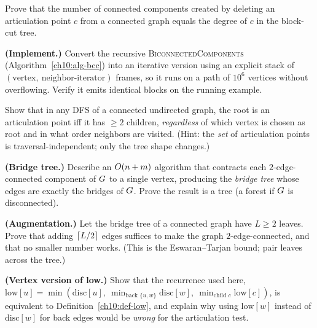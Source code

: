 \begin{exercise}
Prove that the number of connected components created by deleting an articulation point
$c$ from a connected graph equals the degree of $c$ in the block-cut tree.
\end{exercise}

\begin{exercise}
\textbf{(Implement.)} Convert the recursive \textsc{BiconnectedComponents}
(Algorithm~\ref{ch10:alg-bcc}) into an iterative version using an explicit stack of
$(\text{vertex},\ \text{neighbor-iterator})$ frames, so it runs on a path of $10^6$
vertices without overflowing. Verify it emits identical blocks on the running example.
\end{exercise}

\begin{exercise}
Show that in any DFS of a connected undirected graph, the root is an articulation point
iff it has $\ge2$ children, \emph{regardless} of which vertex is chosen as root and in
what order neighbors are visited. (Hint: the \emph{set} of articulation points is
traversal-independent; only the tree shape changes.)
\end{exercise}

\begin{exercise}
\textbf{(Bridge tree.)} Describe an $O(n+m)$ algorithm that contracts each
$2$-edge-connected component of $G$ to a single vertex, producing the \emph{bridge
tree} whose edges are exactly the bridges of $G$. Prove the result is a tree (a
forest if $G$ is disconnected).
\end{exercise}

\begin{exercise}
\textbf{(Augmentation.)} Let the bridge tree of a connected graph have $L\ge2$ leaves.
Prove that adding $\lceil L/2\rceil$ edges suffices to make the graph $2$-edge-connected, and
that no smaller number works. (This is the Eswaran--Tarjan bound; pair leaves across the
tree.)
\end{exercise}

\begin{exercise}
\textbf{(Vertex version of low.)} Show that the recurrence used here,
$\mathrm{low}[u]=\min(\mathrm{disc}[u],\ \min_{\text{back }\{u,w\}}\mathrm{disc}[w],\
\min_{\text{child }c}\mathrm{low}[c])$, is equivalent to Definition~\ref{ch10:def-low},
and explain why using $\mathrm{low}[w]$ instead of $\mathrm{disc}[w]$ for back edges
would be \emph{wrong} for the articulation test.
\end{exercise}

